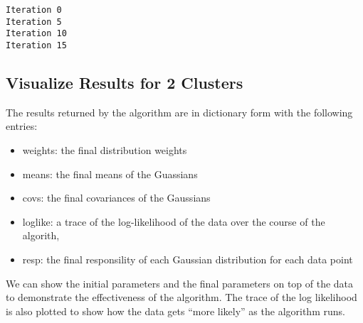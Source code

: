 \documentclass[12pt]{article}
\providecommand{\tightlist}{%
      \setlength{\itemsep}{0pt}\setlength{\parskip}{0pt}}
\begin{document}
    \begin{Verbatim}[commandchars=\\\{\}]
Iteration 0
Iteration 5
Iteration 10
Iteration 15

    \end{Verbatim}

    \hypertarget{visualize-results-for-2-clusters}{%
\subsection{Visualize Results for 2
Clusters}\label{visualize-results-for-2-clusters}}

The results returned by the algorithm are in dictionary form with the
following entries:

\begin{itemize}
\tightlist
\item
  weights: the final distribution weights
\item
  means: the final means of the Guassians
\item
  covs: the final covariances of the Gaussians
\item
  loglike: a trace of the log-likelihood of the data over the course of
  the algorith,
\item
  resp: the final responsility of each Gaussian distribution for each
  data point
\end{itemize}

We can show the initial parameters and the final parameters on top of
the data to demonstrate the effectiveness of the algorithm. The trace of
the log likelihood is also plotted to show how the data gets ``more
likely'' as the algorithm runs.
\end{document}
